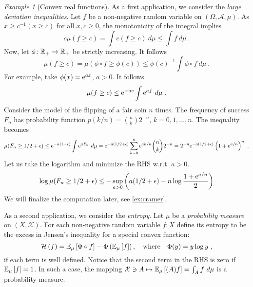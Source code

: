 \documentclass[12pt,a4paper]{amsart}
\theoremstyle{plain}%
\theoremstyle{definition}
\theoremstyle{remark}
\newtheorem{example}{Example}
\begin{document}
\begin{example}[Convex real functions]
As a first application, we consider the \emph{large deviation
  inequalities}. Let $f$ be a non-negative random variable on
$(\Omega,\mathcal A,\mu)$. As $x \geq c^{-1}(x \geq c)$ for all $x,c
\geq 0$, the monotonicity of the integral implies
\begin{equation*}
  c \mu(f \geq c) = \int c (f \geq c) \ d\mu \leq \int f \ d\mu \ .
\end{equation*}
Now, let $\phi \colon \mathbb{R}_+ \to \mathbb{R}_+$ be strictly
increasing. It follows
\begin{equation*}
  \mu(f \geq c) = \mu(\phi\circ f \geq \phi(c)) \leq \phi(c)^{-1}
  \int \phi\circ f \ d\mu \ . 
\end{equation*}
For example, take $\phi(x) = \mathrm{e}^{ax}$, $a > 0$. It follows
\begin{equation*}
  \mu(f \geq c) \leq \mathrm{e}^{-ac} \int \mathrm{e}^{af} \ d\mu \ . 
\end{equation*}
Consider the model of the flipping of a fair coin $n$ times. The frequency of success $F_n$ has probability function $p(k/n) = \binom n k 2^{-n}$, $k=0,1,\dots,n$. The inequality becomes
\begin{equation*}
  \mu(F_n \geq 1/2 + \epsilon) \leq \mathrm{e}^{-a(1+\epsilon)} \int \mathrm{e}^{a F_n} \ d\mu =
  \mathrm{e}^{-a(1/2+\epsilon)} \sum_{k=0}^n \mathrm{e}^{ak/n} \binom n k 2^{-n} = 2^{-n}
  \mathrm{e}^{-a(1/2+\epsilon)} \left(1 + \mathrm{e}^{a/n}\right)^n \ .
\end{equation*}
Let us take the logarithm and minimize the RHS w.r.t. $a > 0$.
\begin{equation*}
  \log \mu(F_n \geq 1/2+\epsilon) \leq - \sup_{a > 0} \left(a(1/2 + \epsilon) - n \log\frac{1+\mathrm{e}^{a/n}}2\right)
\end{equation*}
We will finalize the computation later, see \cref{ex:cramer}.

As a second application, we consider the \emph{entropy}. Let $\mu$ be a \emph{probability measure} on
$(X,\mathcal X)$. For each non-negative random variable $f \colon X$
define its entropy to be the excess in Jensen's inequality for a special convex function:
\begin{equation*}
  \entropyof{f} = \expectat \mu {\Phi\circ f} - \Phi\left(\expectat
    \mu f\right), \quad \text{where} \quad \Phi(y) = y \log y \ ,
\end{equation*}
if each term is well defined. Notice that the second term in the RHS is zero if $\operatorname{\mathbb E}_{\mu}\left[f\right] = 1$. In such a case, the mapping $\mathcal X \ni A \mapsto \operatorname{\mathbb E}_{\mu}\left[(A)f\right] = \int _A f \ d\mu$ is a probability measure.


\end{example}
\end{document}
